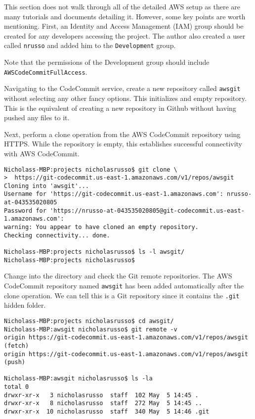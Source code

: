 This section does not walk through all of the detailed AWS setup as there are
many tutorials and documents detailing it. However, some key points are worth
mentioning. First, an Identity and Access Management (IAM) group should be
created for any developers accessing the project. The author also created a
user called \verb|nrusso| and added him to the \verb|Development| group.


Note that the permissions of the Development group should include
\verb|AWSCodeCommitFullAccess|.


Navigating to the CodeCommit service, create a new repository called
\verb|awsgit| without selecting any other fancy options. This initializes and
empty repository. This is the equivalent of creating a new repository in
Github without having pushed any files to it.


Next, perform a clone operation from the AWS CodeCommit repository using
HTTPS\@. While the repository is empty, this establishes successful connectivity
with AWS CodeCommit.

\begin{verbatim}
Nicholass-MBP:projects nicholasrusso$ git clone \
>  https://git-codecommit.us-east-1.amazonaws.com/v1/repos/awsgit
Cloning into 'awsgit'...
Username for 'https://git-codecommit.us-east-1.amazonaws.com': nrusso-at-043535020805
Password for 'https://nrusso-at-043535020805@git-codecommit.us-east-1.amazonaws.com':
warning: You appear to have cloned an empty repository.
Checking connectivity... done.

Nicholass-MBP:projects nicholasrusso$ ls -l awsgit/
Nicholass-MBP:projects nicholasrusso$
\end{verbatim}

Change into the directory and check the Git remote repositories. The AWS
CodeCommit repository named \verb|awsgit| has been added automatically after
the clone operation. We can tell this is a Git repository since it contains
the \verb|.git| hidden folder.

\begin{verbatim}
Nicholass-MBP:projects nicholasrusso$ cd awsgit/
Nicholass-MBP:awsgit nicholasrusso$ git remote -v
origin https://git-codecommit.us-east-1.amazonaws.com/v1/repos/awsgit (fetch)
origin https://git-codecommit.us-east-1.amazonaws.com/v1/repos/awsgit (push)

Nicholass-MBP:awsgit nicholasrusso$ ls -la
total 0
drwxr-xr-x   3 nicholasrusso  staff  102 May  5 14:45 .
drwxr-xr-x   8 nicholasrusso  staff  272 May  5 14:45 ..
drwxr-xr-x  10 nicholasrusso  staff  340 May  5 14:46 .git
\end{verbatim}

